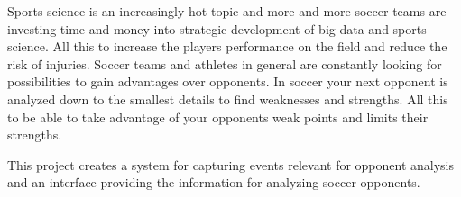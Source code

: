 Sports science is an increasingly hot topic and more and more soccer teams are investing time and money into strategic development of big data and sports science. All this to increase the players performance on the field and reduce the risk of injuries. Soccer teams and athletes in general are constantly looking for possibilities to gain advantages over opponents. In soccer your next opponent is analyzed down to the smallest details to find weaknesses and strengths. All this to be able to take advantage of your opponents weak points and limits their strengths.

This project creates a system for capturing events relevant for opponent analysis and an interface providing the information for analyzing soccer opponents.

